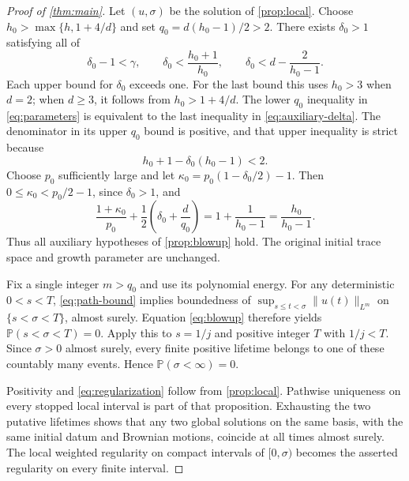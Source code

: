 \documentclass[11pt]{amsart}
\theoremstyle{definition}
\newcommand{\PP}{\mathbb P}
\numberwithin{equation}{section}
\begin{document}
\begin{proof}[Proof of \cref{thm:main}]
Let $(u,\sigma)$ be the solution of \cref{prop:local}.
Choose $h_0>\max\{h,1+4/d\}$ and set $q_0=d(h_0-1)/2>2$. There exists
$\delta_0>1$ satisfying all of
\begin{equation}\label{eq:auxiliary-delta}
\delta_0-1<\gamma,\qquad
\delta_0<\frac{h_0+1}{h_0},\qquad
\delta_0<d-\frac2{h_0-1}.
\end{equation}
Each upper bound for $\delta_0$ exceeds one. For the last bound this
uses $h_0>3$ when $d=2$; when $d\geq3$, it follows from
$h_0>1+4/d$. The lower $q_0$ inequality in
\eqref{eq:parameters} is equivalent to the last inequality in
\eqref{eq:auxiliary-delta}. The denominator in its upper $q_0$ bound
is positive, and that upper inequality is strict because
\[
h_0+1-\delta_0(h_0-1)<2.
\]
Choose $p_0$ sufficiently large and let
$\kappa_0=p_0(1-\delta_0/2)-1$. Then
$0\leq\kappa_0<p_0/2-1$, since $\delta_0>1$, and
\[
\frac{1+\kappa_0}{p_0}
 +\frac12\left(\delta_0+\frac d{q_0}\right)
 =1+\frac1{h_0-1}=\frac{h_0}{h_0-1}.
\]
Thus all auxiliary hypotheses of \cref{prop:blowup} hold. The original
initial trace space and growth parameter are unchanged.

Fix a single integer $m>q_0$ and use its polynomial energy. For any
deterministic $0<s<T$, \eqref{eq:path-bound} implies boundedness of
$\sup_{s\leq t<\sigma}\|u(t)\|_{L^m}$ on $\{s<\sigma<T\}$,
almost surely. Equation \eqref{eq:blowup} therefore yields
$\PP(s<\sigma<T)=0$. Apply this to $s=1/j$ and positive integer $T$
with $1/j<T$. Since $\sigma>0$ almost surely, every finite positive
lifetime belongs to one of these countably many events. Hence
$\PP(\sigma<\infty)=0$.

Positivity and \eqref{eq:regularization} follow from
\cref{prop:local}. Pathwise uniqueness on every stopped local interval
is part of that proposition. Exhausting the two putative lifetimes
shows that any two global solutions on the same basis, with the same
initial datum and Brownian motions, coincide at all times almost surely.
The local weighted regularity on compact intervals of $[0,\sigma)$
becomes the asserted regularity on every finite interval.
\end{proof}
\end{document}
